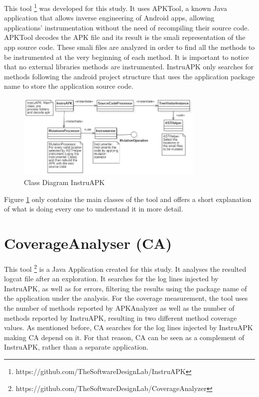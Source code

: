 This tool \footnote{https://github.com/TheSoftwareDesignLab/InstruAPK} was developed for this study. It uses APKTool, a known Java application that allows inverse engineering of Android apps, allowing applications' instrumentation without the need of recompiling their source code. APKTool decodes the APK file and its result is the smali representation of the app source code. These smali files are analyzed in order to find all the methods to be instrumented at the very beginning of each method. It is important to notice that no external libraries methods are instrumented. InstruAPK only searches for methods following the android project structure that uses the application package name to store the application source code.

\begin{figure}[h]
\centering
\includegraphics[width=0.8\textwidth]{../Figures/ClassDiagramInstruAPK.jpg}
\caption{Class Diagram InstruAPK}\label{fig:instruAPK}
\end{figure}

Figure \ref{fig:instruAPK} only contains the main classes of the tool and offers a short explanation of what is doing every one to understand it in more detail.

\section{CoverageAnalyser (CA)}\label{sec:ca}

This tool \footnote{https://github.com/TheSoftwareDesignLab/CoverageAnalyzer} is a Java Application created for this study. It analyses the resulted logcat file after an exploration. It searches for the log lines injected by InstruAPK, as well as for errors, filtering the results using the package name of the application under the analysis. For the coverage measurement, the tool uses the number of methods reported by APKAnalyzer as well as the number of methods reported by InstruAPK, resulting in two different method coverage values. As mentioned before, CA searches for the log lines injected by InstruAPK making CA depend on it. For that reason, CA can be seen as a complement of InstruAPK, rather than a separate application.

